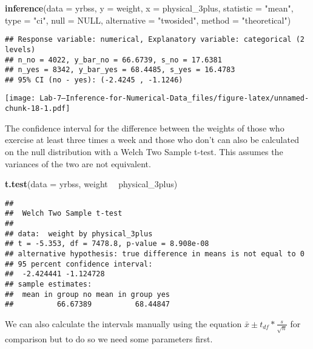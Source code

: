 \documentclass[
]{article}
\newenvironment{Shaded}{\begin{snugshade}}{\end{snugshade}}
\newcommand{\DataTypeTok}[1]{\textcolor[rgb]{0.13,0.29,0.53}{#1}}
\newcommand{\KeywordTok}[1]{\textcolor[rgb]{0.13,0.29,0.53}{\textbf{#1}}}
\newcommand{\NormalTok}[1]{#1}
\newcommand{\OperatorTok}[1]{\textcolor[rgb]{0.81,0.36,0.00}{\textbf{#1}}}
\newcommand{\OtherTok}[1]{\textcolor[rgb]{0.56,0.35,0.01}{#1}}
\newcommand{\StringTok}[1]{\textcolor[rgb]{0.31,0.60,0.02}{#1}}
\begin{document}
\begin{Shaded}
\begin{Highlighting}[]
\KeywordTok{inference}\NormalTok{(}\DataTypeTok{data =}\NormalTok{ yrbss, }\DataTypeTok{y =}\NormalTok{ weight, }\DataTypeTok{x =}\NormalTok{ physical_3plus,}
          \DataTypeTok{statistic =} \StringTok{"mean"}\NormalTok{,}
          \DataTypeTok{type =} \StringTok{"ci"}\NormalTok{, }
          \DataTypeTok{null =} \OtherTok{NULL}\NormalTok{, }
          \DataTypeTok{alternative =} \StringTok{"twosided"}\NormalTok{, }
          \DataTypeTok{method =} \StringTok{"theoretical"}\NormalTok{)}
\end{Highlighting}
\end{Shaded}

\begin{verbatim}
## Response variable: numerical, Explanatory variable: categorical (2 levels)
## n_no = 4022, y_bar_no = 66.6739, s_no = 17.6381
## n_yes = 8342, y_bar_yes = 68.4485, s_yes = 16.4783
## 95% CI (no - yes): (-2.4245 , -1.1246)
\end{verbatim}

\texttt{[image: Lab-7---Inference-for-Numerical-Data\_files/figure-latex/unnamed-chunk-18-1.pdf]}

The confidence interval for the difference between the weights of those
who exercise at least three times a week and those who don't can also be
calculated on the null distribution with a Welch Two Sample t-test. This
assumes the variances of the two are not equivalent.

\begin{Shaded}
\begin{Highlighting}[]
\KeywordTok{t.test}\NormalTok{(}\DataTypeTok{data =}\NormalTok{ yrbss, weight }\OperatorTok{~}\StringTok{ }\NormalTok{physical_3plus)}
\end{Highlighting}
\end{Shaded}

\begin{verbatim}
## 
##  Welch Two Sample t-test
## 
## data:  weight by physical_3plus
## t = -5.353, df = 7478.8, p-value = 8.908e-08
## alternative hypothesis: true difference in means is not equal to 0
## 95 percent confidence interval:
##  -2.424441 -1.124728
## sample estimates:
##  mean in group no mean in group yes 
##          66.67389          68.44847
\end{verbatim}

We can also calculate the intervals manually using the equation
\(\bar{x}\pm t_{df}*\frac{s}{\sqrt{n}}\) for comparison but to do so we
need some parameters first.
\end{document}
